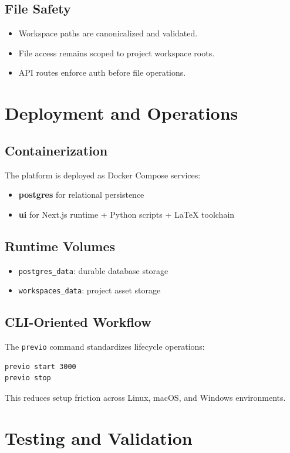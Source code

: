 \documentclass[11pt,a4paper]{article}
\begin{document}
\subsection{File Safety}
\begin{itemize}[leftmargin=1.5em]
  \item Workspace paths are canonicalized and validated.
  \item File access remains scoped to project workspace roots.
  \item API routes enforce auth before file operations.
\end{itemize}

\section{Deployment and Operations}
\subsection{Containerization}
The platform is deployed as Docker Compose services:
\begin{itemize}[leftmargin=1.5em]
  \item \textbf{postgres} for relational persistence
  \item \textbf{ui} for Next.js runtime + Python scripts + LaTeX toolchain
\end{itemize}

\subsection{Runtime Volumes}
\begin{itemize}[leftmargin=1.5em]
  \item \texttt{postgres\_data}: durable database storage
  \item \texttt{workspaces\_data}: project asset storage
\end{itemize}

\subsection{CLI-Oriented Workflow}
The \texttt{previo} command standardizes lifecycle operations:
\begin{lstlisting}[style=previo,language=bash]
previo start 3000
previo stop
\end{lstlisting}
This reduces setup friction across Linux, macOS, and Windows environments.

\section{Testing and Validation}
\end{document}
